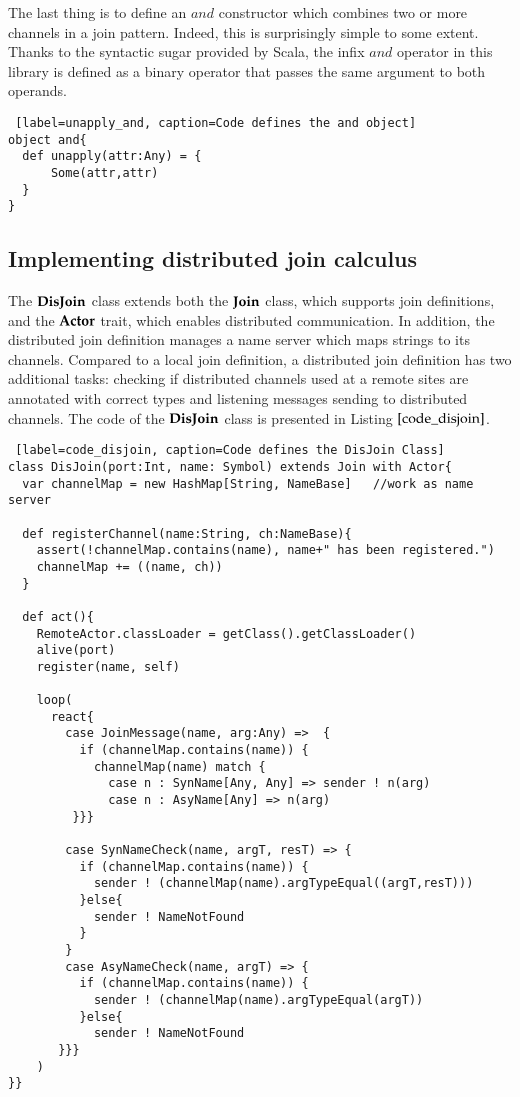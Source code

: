 The last thing is to define an $and$ constructor which combines two or more channels in a join pattern.  Indeed, this is surprisingly simple to some extent.  Thanks to the syntactic sugar provided by Scala, the infix $and$ operator in this library is defined as a binary operator  that passes the same argument to both operands.

\begin{lstlisting} [label=unapply_and, caption=Code defines the and object]
object and{
  def unapply(attr:Any) = {
      Some(attr,attr)
  }
}
\end{lstlisting}

\subsection{Implementing distributed join calculus}
\label{imp_dis_join}

The $\bf{DisJoin}$ class extends both the $\bf{Join}$ class, which supports join definitions, and the $\bf{Actor}$ trait, which enables distributed communication.  In addition, the distributed join definition manages a name server which maps strings to its channels.  Compared to a local join definition, a distributed join definition has two additional tasks: checking if distributed channels used at a remote sites are annotated with correct types and listening messages sending to distributed channels.  The code of the $\bf{DisJoin}$ class is presented in Listing $\ref{code_disjoin}$.


\begin{lstlisting} [label=code_disjoin, caption=Code defines the DisJoin Class]
class DisJoin(port:Int, name: Symbol) extends Join with Actor{
  var channelMap = new HashMap[String, NameBase]   //work as name server
  
  def registerChannel(name:String, ch:NameBase){
    assert(!channelMap.contains(name), name+" has been registered.")
    channelMap += ((name, ch))
  }  
  
  def act(){
    RemoteActor.classLoader = getClass().getClassLoader()
    alive(port)
    register(name, self)
    
    loop(
      react{
        case JoinMessage(name, arg:Any) =>  {
          if (channelMap.contains(name)) {
            channelMap(name) match {
              case n : SynName[Any, Any] => sender ! n(arg)
              case n : AsyName[Any] => n(arg)
         }}}

        case SynNameCheck(name, argT, resT) => {
          if (channelMap.contains(name)) {
            sender ! (channelMap(name).argTypeEqual((argT,resT)))
          }else{
            sender ! NameNotFound
          }
        }
        case AsyNameCheck(name, argT) => {
          if (channelMap.contains(name)) {
            sender ! (channelMap(name).argTypeEqual(argT))
          }else{
            sender ! NameNotFound
       }}}
    )
}}
\end{lstlisting}

